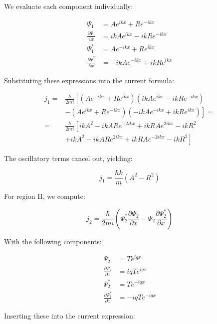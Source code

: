 \documentclass[italian]{HKNdocument}
\begin{document}
We evaluate each component individually:

\begin{align}
\Psi_{1} & =A e^{i k x}+R e^{-i k x} \\
\frac{\partial \Psi_{1}}{\partial x} & =i k A e^{i k x}-i k R e^{-i k x} \\
\Psi_{1}^{*} & =A e^{-i k x}+R e^{i k x}  \\
\frac{\partial \Psi_{1}^{*}}{\partial x} & =-i k A e^{-i k x}+i k R e^{i k x}
\end{align}

Substituting these expressions into the current formula:

\begin{align}
j_{1}= & \frac{\hbar}{2 m i}\left[\left(A e^{-i k x}+R e^{i k x}\right)\left(i k A e^{i k x}-i k R e^{-i k x}\right)\right. \\
& \left.-\left(A e^{i k x}+R e^{-i k x}\right)\left(-i k A e^{-i k x}+i k R e^{i k x}\right)\right]= \\
= & \frac{\hbar}{2 m i}\left[i k A^{2}-i k A R e^{-2 i k x}+i k R A e^{2 i k x}-i k R^{2}\right.  \\
& \left.+i k A^{2}-i k A R e^{2 i k x}+i k R A e^{-2 i k x}-i k R^{2}\right]
\end{align}

The oscillatory terms cancel out, yielding:

\begin{equation}
j_{1}=\frac{\hbar k}{m}\left(A^{2}-R^{2}\right)
\end{equation}

For region II, we compute:

\begin{equation}
j_{2}=\frac{\hbar}{2 m i}\left(\Psi_{2}^{*} \frac{\partial \Psi_{2}}{\partial x}-\Psi_{2} \frac{\partial \Psi_{2}^{*}}{\partial x}\right)
\end{equation}

With the following components:

\begin{align}
\Psi_{2} & =T e^{i q x} \\
\frac{\partial \Psi_{2}}{\partial x} & =i q T e^{i q x}  \\
\Psi_{2}^{*} & =T e^{-i q x} \\
\frac{\partial \Psi_{2}^{*}}{\partial x} & =-i q T e^{-i q x}
\end{align}

Inserting these into the current expression:
\end{document}
